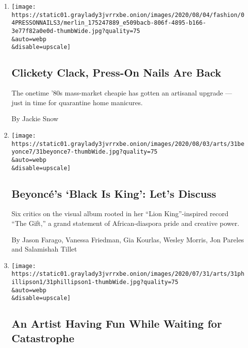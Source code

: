 \begin{enumerate}
\def\labelenumi{\arabic{enumi}.}
\item
  \href{/2020/08/04/style/self-care/press-on-nails.html}{}

  \texttt{[image: https://static01.graylady3jvrrxbe.onion/images/2020/08/04/fashion/04PRESSONNAILS3/merlin\_175247889\_e509bacb-806f-4895-b166-3e77f82a0e0d-thumbWide.jpg?quality=75\\\&auto=webp\\\&disable=upscale]}

  \hypertarget{clickety-clack-press-on-nails-are-back}{%
  \subsection{Clickety Clack, Press-On Nails Are
  Back}\label{clickety-clack-press-on-nails-are-back}}

  The onetime '80s mass-market cheapie has gotten an artisanal upgrade
  --- just in time for quarantine home manicures.

  By Jackie Snow
\item
  \href{/2020/07/31/arts/music/beyonce-black-is-king.html}{}

  \texttt{[image: https://static01.graylady3jvrrxbe.onion/images/2020/08/03/arts/31beyonce7/31beyonce7-thumbWide.jpg?quality=75\\\&auto=webp\\\&disable=upscale]}

  \hypertarget{beyoncuxe9s-black-is-king-lets-discuss}{%
  \subsection{Beyoncé's `Black Is King': Let's
  Discuss}\label{beyoncuxe9s-black-is-king-lets-discuss}}

  Six critics on the visual album rooted in her ``Lion King''-inspired
  record ``The Gift,'' a grand statement of African-diaspora pride and
  creative power.

  By Jason Farago, Vanessa Friedman, Gia Kourlas, Wesley Morris, Jon
  Pareles and Salamishah Tillet
\item
  \href{/2020/07/31/arts/design/heather-phillipson-fourth-plinth.html}{}

  \texttt{[image: https://static01.graylady3jvrrxbe.onion/images/2020/07/31/arts/31phillipson1/31phillipson1-thumbWide.jpg?quality=75\\\&auto=webp\\\&disable=upscale]}

  \hypertarget{an-artist-having-fun-while-waiting-for-catastrophe}{%
  \subsection{An Artist Having Fun While Waiting for
  Catastrophe}\label{an-artist-having-fun-while-waiting-for-catastrophe}}


\end{enumerate}
